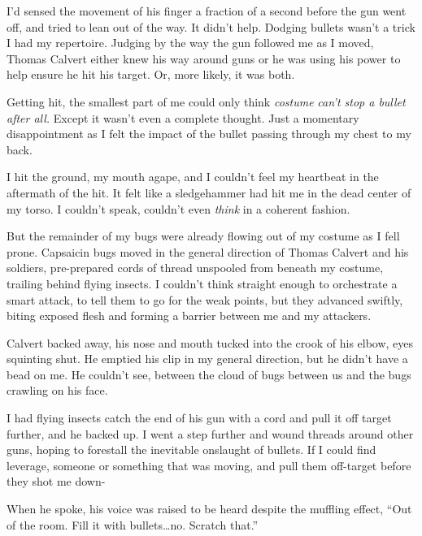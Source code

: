 





I'd sensed the movement of his finger a fraction of a second before the gun went off, and tried to lean out of the way.  It didn't help.  Dodging bullets wasn't a trick I had my repertoire.  Judging by the way the gun followed me as I moved, Thomas Calvert either knew his way around guns or he was using his power to help ensure he hit his target.  Or, more likely, it was both.



Getting hit, the smallest part of me could only think \emph{costume }\emph{can't stop a bullet after all.  }Except it wasn't even a complete thought.  Just a momentary disappointment as I felt the impact of the bullet passing through my chest to my back.



I hit the ground, my mouth agape, and I couldn't feel my heartbeat in the aftermath of the hit.  It felt like a sledgehammer had hit me in the dead center of my torso.  I couldn't speak, couldn't even \emph{think }in a coherent fashion.



But the remainder of my bugs were already flowing out of my costume as I fell prone.  Capsaicin bugs moved in the general direction of Thomas Calvert and his soldiers, pre-prepared cords of thread unspooled from beneath my costume, trailing behind flying insects.  I couldn't think straight enough to orchestrate a smart attack, to tell them to go for the weak points, but they advanced swiftly, biting exposed flesh and forming a barrier between me and my attackers.



Calvert backed away, his nose and mouth tucked into the crook of his elbow, eyes squinting shut.  He emptied his clip in my general direction, but he didn't have a bead on me.  He couldn't see, between the cloud of bugs between us and the bugs crawling on his face.



I had flying insects catch the end of his gun with a cord and pull it off target further, and he backed up.  I went a step further and wound threads around other guns, hoping to forestall the inevitable onslaught of bullets.  If I could find leverage, someone or something that was moving, and pull them off-target before they shot me down-



When he spoke, his voice was raised to be heard despite the muffling effect, ``Out of the room.  Fill it with bullets\ldots no.  Scratch that.''



